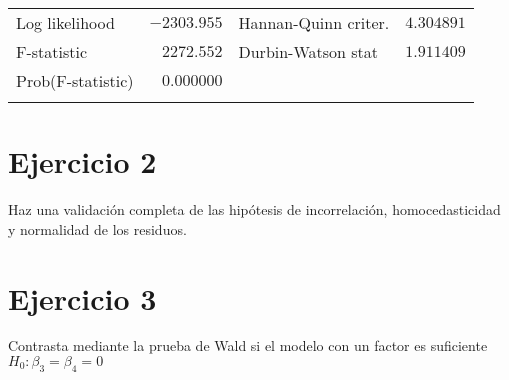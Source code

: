 \documentclass[12pt]{article}
\numberwithin{equation}{section} %
\begin{document}
\begin{table}[!htbp]
\begin{tabular}{lrrrr}
\multicolumn{1}{l}{Log likelihood}&\multicolumn{1}{r}{$-2303.955$}&\multicolumn{2}{l}{Hannan-Quinn criter.}&\multicolumn{1}{r}{$4.304891$}\\
\multicolumn{1}{l}{F-statistic}&\multicolumn{1}{r}{$2272.552$}&\multicolumn{2}{l}{Durbin-Watson stat}&\multicolumn{1}{r}{$1.911409$}\\
\multicolumn{1}{l}{Prob(F-statistic)}&\multicolumn{1}{r}{$0.000000$}&\multicolumn{1}{c}{}&\multicolumn{1}{c}{}&\multicolumn{1}{c}{}\\
[4.5pt] \hline \\ [-4.5pt]
\end{tabular}
\end{table}

\section{Ejercicio 2} Haz una validación completa de las hipótesis de incorrelación, homocedasticidad y normalidad de los residuos.

\section{Ejercicio 3} Contrasta mediante la prueba de Wald si el modelo con un factor es suficiente $H_0: \beta_3 = \beta_4 = 0$
\end{document}
